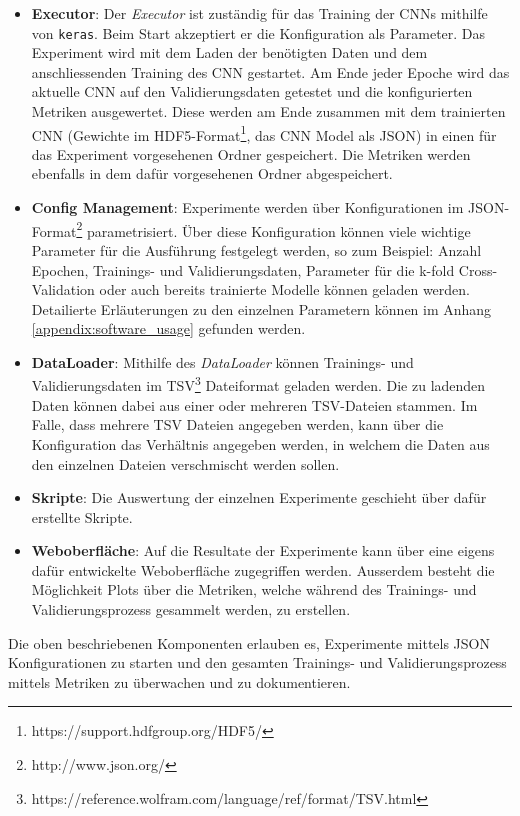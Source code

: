\begin{itemize}
	\item \textbf{Executor}: Der \emph{Executor} ist zuständig für das Training der CNNs mithilfe von \texttt{keras}. Beim Start akzeptiert er die Konfiguration als Parameter. Das Experiment wird mit dem Laden der benötigten Daten und dem anschliessenden Training des CNN gestartet. Am Ende jeder Epoche wird das aktuelle CNN auf den Validierungsdaten getestet und die konfigurierten Metriken ausgewertet. Diese werden am Ende zusammen mit dem trainierten CNN (Gewichte im HDF5-Format\footnote{https://support.hdfgroup.org/HDF5/}, das CNN Model als JSON) in einen für das Experiment vorgesehenen Ordner gespeichert. Die Metriken werden ebenfalls in dem dafür vorgesehenen Ordner abgespeichert.
	\item \textbf{Config Management}: Experimente werden über Konfigurationen im JSON-Format\footnote{http://www.json.org/} parametrisiert. Über diese Konfiguration können viele wichtige Parameter für die Ausführung festgelegt werden, so zum Beispiel: Anzahl Epochen, Trainings- und Validierungsdaten, Parameter für die k-fold Cross-Validation oder auch bereits trainierte Modelle können geladen werden. Detailierte Erläuterungen zu den einzelnen Parametern können im Anhang \ref{appendix:software_usage} gefunden werden.
	\item \textbf{DataLoader}: Mithilfe des \emph{DataLoader} können Trainings- und Validierungsdaten im TSV\footnote{https://reference.wolfram.com/language/ref/format/TSV.html} Dateiformat geladen werden. Die zu ladenden Daten können dabei aus einer oder mehreren TSV-Dateien stammen. Im Falle, dass mehrere TSV Dateien angegeben werden, kann über die Konfiguration das Verhältnis angegeben werden, in welchem die Daten aus den einzelnen Dateien verschmischt werden sollen.
	\item \textbf{Skripte}: Die Auswertung der einzelnen Experimente geschieht über dafür erstellte Skripte.
	\item \textbf{Weboberfläche}: Auf die Resultate der Experimente kann über eine eigens dafür entwickelte Weboberfläche zugegriffen werden. Ausserdem besteht die Möglichkeit Plots über die Metriken, welche während des Trainings- und Validierungsprozess gesammelt werden, zu erstellen.
	
\end{itemize}
Die oben beschriebenen Komponenten erlauben es, Experimente mittels JSON Konfigurationen zu starten und den gesamten Trainings- und Validierungsprozess mittels Metriken zu überwachen und zu dokumentieren.

